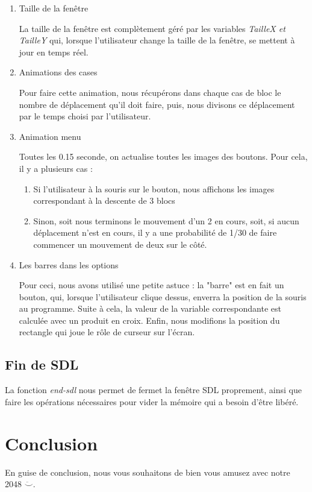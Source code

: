 \documentclass[letter]{article}
\begin{document}
\begin{enumerate}
\begin{enumerate}
\item Taille de la fenêtre
\label{sec:orgae440e9}

La taille de la fenêtre est complètement géré par les variables \emph{TailleX et TailleY} qui, lorsque l'utilisateur change la taille de la fenêtre, se mettent à jour en temps réel.



\item Animations des cases
\label{sec:orgdcfb534}


Pour faire cette animation, nous récupérons dans chaque cas de bloc le nombre de déplacement qu'il doit faire, puis, nous divisons ce déplacement par le temps choisi par l'utilisateur.



\item Animation menu
\label{sec:org14e127c}

Toutes les 0.15 seconde, on actualise toutes les images des boutons. Pour cela, il y a plusieurs cas :
\begin{enumerate}
\item Si l'utilisateur à la souris sur le bouton, nous affichons les images correspondant à la descente de 3 blocs
\item Sinon, soit nous terminons le mouvement d'un 2 en cours, soit, si aucun déplacement n'est en cours, il y a une probabilité de 1/30 de faire commencer un mouvement de deux sur le côté.
\end{enumerate}


\item Les barres dans les options
\label{sec:orgda43e16}

Pour ceci, nous avons utilisé une petite astuce : la "barre" est en fait un bouton, qui, lorsque l'utilisateur clique dessus, enverra la position de la souris au programme. Suite à cela, la valeur de la variable correspondante est calculée avec un produit en croix. Enfin, nous modifions la position du rectangle qui joue le rôle de curseur sur l'écran.
\end{enumerate}
\end{enumerate}


\subsection{Fin de SDL}
\label{sec:org70a9c66}

La fonction \emph{end-sdl} nous permet de fermet la fenêtre SDL proprement, ainsi que faire les opérations nécessaires pour vider la mémoire qui a besoin d'être libéré.






\section{Conclusion}
\label{sec:org4aea38e}

En guise de conclusion, nous vous souhaitons de bien vous amusez avec notre 2048 \(\ddot\smile\).
\end{document}
